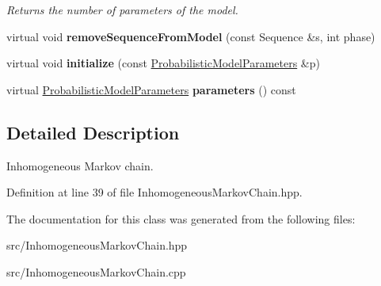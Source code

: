 \begin{DoxyCompactItemize}
\begin{DoxyCompactList}\small\item\em Returns the number of parameters of the model. \end{DoxyCompactList}\item 
\mbox{\label{classtops_1_1InhomogeneousMarkovChain_a251f04c2250da5f8b1a8ae0df309324f}} 
virtual void {\bfseries remove\+Sequence\+From\+Model} (const Sequence \&s, int phase)
\item 
\mbox{\label{classtops_1_1InhomogeneousMarkovChain_aaba5bfa5af523fa57de784ee45ac98a2}} 
virtual void {\bfseries initialize} (const \hyperlink{classtops_1_1ProbabilisticModelParameters}{Probabilistic\+Model\+Parameters} \&p)
\item 
\mbox{\label{classtops_1_1InhomogeneousMarkovChain_a8d52df52a4671b1cc34a139183b386ff}} 
virtual \hyperlink{classtops_1_1ProbabilisticModelParameters}{Probabilistic\+Model\+Parameters} {\bfseries parameters} () const
\end{DoxyCompactItemize}


\subsection{Detailed Description}
Inhomogeneous Markov chain. 

Definition at line 39 of file Inhomogeneous\+Markov\+Chain.\+hpp.



The documentation for this class was generated from the following files\+:\begin{DoxyCompactItemize}
\item 
src/Inhomogeneous\+Markov\+Chain.\+hpp\item 
src/Inhomogeneous\+Markov\+Chain.\+cpp\end{DoxyCompactItemize}
